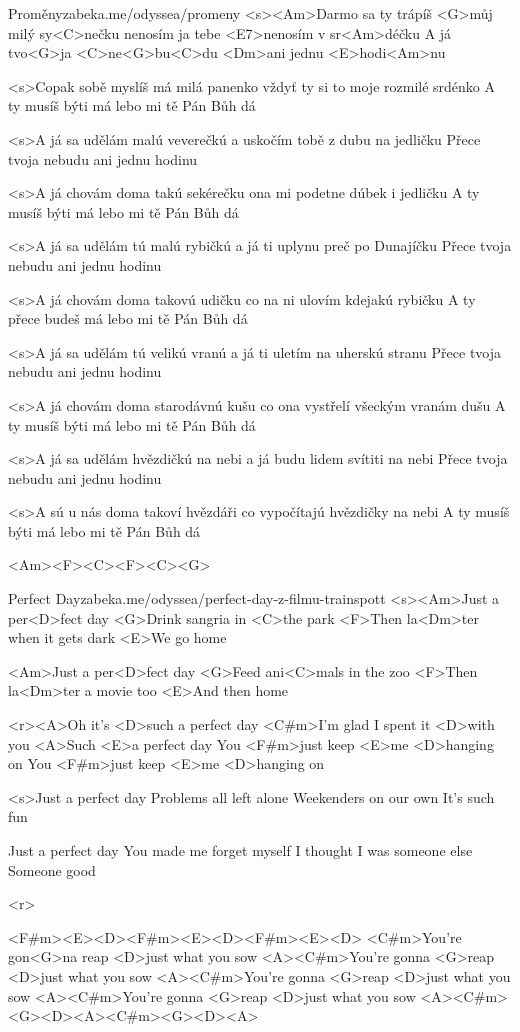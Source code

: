 \begin{song}[Čechomor]{28}{Proměny}{zabeka.me/odyssea/promeny}
<s><Am>Darmo sa ty trápíš <G>můj milý sy<C>nečku
nenosím ja tebe <E7>nenosím v sr<Am>déčku
A já tvo<G>ja <C>ne<G>bu<C>du <Dm>ani jednu <E>hodi<Am>nu

<s>Copak sobě myslíš má milá panenko
vždyť ty si to moje rozmilé srdénko
A ty musíš býti má lebo mi tě Pán Bůh dá

<s>A já sa udělám malú veverečkú
a uskočím tobě z dubu na jedličku
Přece tvoja nebudu ani jednu hodinu

<s>A já chovám doma takú sekérečku
ona mi podetne dúbek i jedličku
A ty musíš býti má lebo mi tě Pán Bůh dá

<s>A já sa udělám tú malú rybičkú
a já ti uplynu preč po Dunajíčku
Přece tvoja nebudu ani jednu hodinu

<s>A já chovám doma takovú udičku
co na ni ulovím kdejakú rybičku
A ty přece budeš má lebo mi tě Pán Bůh dá

<s>A já sa udělám tú velikú vranú
a já ti uletím na uherskú stranu
Přece tvoja nebudu ani jednu hodinu

<s>A já chovám doma starodávnú kušu
co ona vystřelí všeckým vranám dušu
A ty musíš býti má lebo mi tě Pán Bůh dá

<s>A já sa udělám hvězdičkú na nebi
a já budu lidem svítiti na nebi
Přece tvoja nebudu ani jednu hodinu

<s>A sú u nás doma takoví hvězdáři
co vypočítajú hvězdičky na nebi
A ty musíš býti má lebo mi tě Pán Bůh dá

<Am><F><C><F><C><G> 

\end{song}
\begin{song}{29}{Perfect Day}{zabeka.me/odyssea/perfect-day-z-filmu-trainspott}
<s><Am>Just a per<D>fect day
<G>Drink sangria in <C>the park
<F>Then la<Dm>ter when it gets dark
<E>We go home

<Am>Just a per<D>fect day
<G>Feed ani<C>mals in the zoo
<F>Then la<Dm>ter a movie too
<E>And then home

<r><A>Oh it's <D>such a perfect day
<C#m>I'm glad I spent it <D>with you
<A>Such <E>a perfect day
You <F#m>just keep <E>me <D>hanging on
You <F#m>just keep <E>me <D>hanging on

<s>Just a perfect day 
Problems all left alone
Weekenders on our own
It's such fun

Just a perfect day
You made me forget myself
I thought I was someone else
Someone good

<r> 

<F#m><E><D><F#m><E><D><F#m><E><D>
<C#m>You're gon<G>na reap <D>just what you sow
<A><C#m>You're gonna <G>reap <D>just what you sow
<A><C#m>You're gonna <G>reap <D>just what you sow
<A><C#m>You're gonna <G>reap <D>just what you sow
<A><C#m><G><D><A><C#m><G><D><A>
\end{song}
